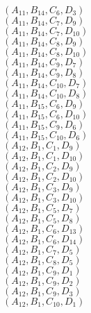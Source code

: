 \documentclass[14pt]{article}
\begin{document}
    $({A}_{11}, {B}_{14}, {C}_{6}, {D}_{3}) $ \\ 
    $({A}_{11}, {B}_{14}, {C}_{7}, {D}_{9}) $ \\ 
    $({A}_{11}, {B}_{14}, {C}_{7}, {D}_{10}) $ \\ 
    $({A}_{11}, {B}_{14}, {C}_{8}, {D}_{9}) $ \\ 
    $({A}_{11}, {B}_{14}, {C}_{8}, {D}_{10}) $ \\ 
    $({A}_{11}, {B}_{14}, {C}_{9}, {D}_{7}) $ \\ 
    $({A}_{11}, {B}_{14}, {C}_{9}, {D}_{8}) $ \\ 
    $({A}_{11}, {B}_{14}, {C}_{10}, {D}_{7}) $ \\ 
    $({A}_{11}, {B}_{14}, {C}_{10}, {D}_{8}) $ \\ 
    $({A}_{11}, {B}_{15}, {C}_{6}, {D}_{9}) $ \\ 
    $({A}_{11}, {B}_{15}, {C}_{6}, {D}_{10}) $ \\ 
    $({A}_{11}, {B}_{15}, {C}_{9}, {D}_{6}) $ \\ 
    $({A}_{11}, {B}_{15}, {C}_{10}, {D}_{6}) $ \\ 
    $({A}_{12}, {B}_{1}, {C}_{1}, {D}_{9}) $ \\ 
    $({A}_{12}, {B}_{1}, {C}_{1}, {D}_{10}) $ \\ 
    $({A}_{12}, {B}_{1}, {C}_{2}, {D}_{9}) $ \\ 
    $({A}_{12}, {B}_{1}, {C}_{2}, {D}_{10}) $ \\ 
    $({A}_{12}, {B}_{1}, {C}_{3}, {D}_{9}) $ \\ 
    $({A}_{12}, {B}_{1}, {C}_{3}, {D}_{10}) $ \\ 
    $({A}_{12}, {B}_{1}, {C}_{5}, {D}_{7}) $ \\ 
    $({A}_{12}, {B}_{1}, {C}_{5}, {D}_{8}) $ \\ 
    $({A}_{12}, {B}_{1}, {C}_{6}, {D}_{13}) $ \\ 
    $({A}_{12}, {B}_{1}, {C}_{6}, {D}_{14}) $ \\ 
    $({A}_{12}, {B}_{1}, {C}_{7}, {D}_{5}) $ \\ 
    $({A}_{12}, {B}_{1}, {C}_{8}, {D}_{5}) $ \\ 
    $({A}_{12}, {B}_{1}, {C}_{9}, {D}_{1}) $ \\ 
    $({A}_{12}, {B}_{1}, {C}_{9}, {D}_{2}) $ \\ 
    $({A}_{12}, {B}_{1}, {C}_{9}, {D}_{3}) $ \\ 
    $({A}_{12}, {B}_{1}, {C}_{10}, {D}_{1}) $ \\ 
\end{document}
